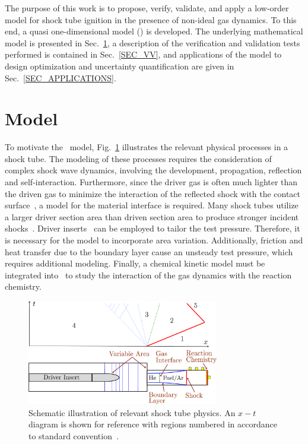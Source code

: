 	The purpose of this work is to propose, verify, validate, and apply a low-order model for shock tube ignition in the presence of non-ideal gas dynamics. To this end, a quasi one-dimensional model (\stnshk) is developed. The underlying mathematical model is presented in Sec.~\ref{SEC_MODEL}, a description of the verification and validation tests performed is contained in Sec.~\ref{SEC_VV}, and applications of the model to design optimization and uncertainty quantification are given in Sec.~\ref{SEC_APPLICATIONS}.
\section{Model}\label{SEC_MODEL}

To motivate the \stnshk\ model, Fig.~\ref{FIG_STPHYS} illustrates the relevant physical processes in a shock tube. The modeling of these processes requires the consideration of complex shock wave dynamics, involving the development, propagation, reflection and self-interaction. Furthermore, since the driver gas is often much lighter than the driven gas to minimize the interaction of the reflected shock with the contact surface~\cite{HANDBOOK_OF_SHOCKWAVES}, a model for the material interface is required. Many shock tubes utilize a larger driver section area than driven section area to produce stronger incident shocks~\cite{ALPHER_JFM58}. Driver inserts~\cite{HONG_PANG_VASU_DAVIDSON_HANSON_SW2009} can be employed to tailor the test pressure. Therefore, it is necessary for the model to incorporate area variation. Additionally, friction and heat transfer due to the boundary layer cause an unsteady test pressure, which requires additional modeling. Finally, a chemical kinetic model must be integrated into \stnshk\ to study the interaction of the gas dynamics with the reaction chemistry. 

\begin{figure}[!ht!]
	\begin{center}
		\includegraphics[width=84mm]{shockTubePhysics}
	\end{center}
	\caption{\label{FIG_STPHYS}Schematic illustration of relevant shock tube physics. An $x-t$ diagram is shown for reference with regions numbered in accordance to standard convention~\cite{HANDBOOK_OF_SHOCKWAVES}.}
\end{figure}

